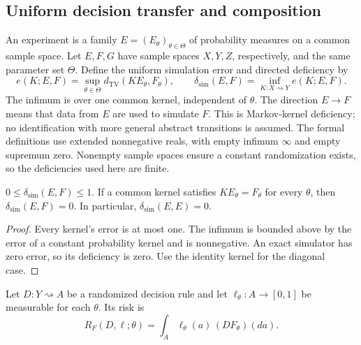 \subsection{Uniform decision transfer and composition}

An experiment is a family $E=(E_\theta)_{\theta\in\Theta}$ of
probability measures on a common sample space. Let $E,F,G$ have sample
spaces $X,Y,Z$, respectively, and the same parameter set $\Theta$.
Define the uniform simulation error and directed deficiency by
\[
 e(K;E,F)=\sup_{\theta\in\Theta}
   d_{\mathrm{TV}}(KE_\theta,F_\theta),\qquad
 \delta_{\mathrm{sim}}(E,F)=\inf_{K:X\rightsquigarrow Y} e(K;E,F).
\]
The infimum is over one common kernel, independent of $\theta$.
The direction $E\to F$ means that data from $E$ are used to simulate
$F$. This is Markov-kernel deficiency; no identification with more
general abstract transitions is assumed. The formal definitions use
extended nonnegative reals, with empty infimum $\infty$ and empty
supremum zero. Nonempty sample spaces ensure a constant randomization
exists, so the deficiencies used here are finite.

\begin{lemma}
$0\le\delta_{\mathrm{sim}}(E,F)\le1$. If a common kernel satisfies
$KE_\theta=F_\theta$ for every $\theta$, then
$\delta_{\mathrm{sim}}(E,F)=0$. In particular,
$\delta_{\mathrm{sim}}(E,E)=0$.
\end{lemma}
\begin{proof}
Every kernel's error is at most one. The infimum is bounded above by
the error of a constant probability kernel and is nonnegative.
An exact simulator has zero error, so its deficiency is zero. Use the
identity kernel for the diagonal case.
\end{proof}

Let $D:Y\rightsquigarrow A$ be a randomized decision rule and let
$\ell_\theta:A\to[0,1]$ be measurable for each $\theta$. Its risk is
\[
 R_F(D,\ell;\theta)=\int_A\ell_\theta(a)\,(DF_\theta)(da).
\]

